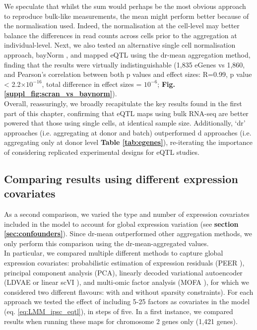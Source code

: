 We speculate that whilst the sum would perhaps be the most obvious approach to reproduce bulk-like measurements, the mean might perform better because of the normalisation used.
Indeed, the normalisation at the cell-level may better balance the differences in read counts across cells prior to the aggregation at individual-level. 
Next, we also tested an alternative single cell normalisation approach, bayNorm \cite{tang2020baynorm}, and mapped eQTL using the dr-mean aggregation method, finding that the results were virtually indistinguishable (1,835 eGenes vs 1,860, and Pearson's correlation between both p values and effect sizes: R=0.99, p value < 2.2$\times 10^{-16}$, total difference in effect sizes = $10^{-6}$; \textbf{Fig. \ref{suppl_fig:scran_vs_baynorm}}). \\

Overall, reassuringly, we broadly recapitulate the key results found in the first part of this chapter, confirming that eQTL maps using bulk RNA-seq are better powered that those using single cells, at identical sample size.
Additionally, `dr' approaches (i.e. aggregating at donor and batch) outperformed d approaches (i.e. aggregating only at donor level \textbf{Table \ref{tab:egenes}}), re-iterating the importance of considering replicated experimental designs for eQTL studies.

\subsection{Comparing results using different expression covariates}


As a second comparison, we varied the type and number of expression covariates included in the model to account for global expression variation (see \textbf{section \ref{sec:confounders}}).
Since dr-mean outperformed other aggregation methods, we only perform this comparison using the dr-mean-aggregated values. \\

In particular, we compared multiple different methods to capture global expression covariates: probabilistic estimation of expression residuals (PEER \cite{stegle2010bayesian,stegle2012using}), principal component analysis (PCA), linearly decoded variational autoencoder (LDVAE or linear scVI \cite{svensson2020interpretable}), and multi-omic factor analysis (MOFA \cite{argelaguet2018multi}), for which we considered two different flavours: with and without sparsity constraints).
For each approach we tested the effect of including 5-25 factors as covariates in the model (eq. \eqref{eq:LMM_ipsc_eqtl}), in steps of five.
In a first instance, we compared results when running these maps for chromosome 2 genes only (1,421 genes). \\

